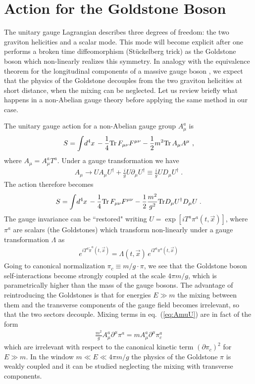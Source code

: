 \documentclass[12pt,letterpaper]{article}
\def\be{\begin{eqnarray}}
\def\ee{\end{eqnarray}}
\begin{document}
{\section{Action for the Goldstone Boson\label{sec:Goldstone}}
The unitary gauge Lagrangian describes three degrees of freedom: the
two graviton helicities and a scalar mode. This mode will become
explicit after one performs a broken time diffeomorphism
(St\"u{}ckelberg trick) as the Goldstone boson which non-linearly realizes this symmetry. In analogy with the equivalence theorem for the longitudinal components of a massive gauge boson \cite{Cornwall:1974km}, we expect that the physics of the Goldstone decouples from the two graviton helicities at short distance, when the mixing can be neglected.
Let us review briefly what happens in a non-Abelian gauge theory before applying the same method in our case.

The unitary gauge action for a non-Abelian gauge group $A_\mu^a$ is
\be
S = \int \! d^4x  \,-\frac{1}{4} {\rm Tr}\, F_{\mu\nu}F^{\mu\nu}-\frac12 m^2 {\rm Tr}\, A_\mu A^\mu \ ,
\ee
where $A_\mu = A_\mu^a T^a$.
Under a gauge transformation we have
\be
\label{eq:AmuU}
A_\mu \to U A_\mu U^\dagger + \frac{i}{g} U \partial_\mu U^\dagger \equiv \frac{i}{g} U D_\mu U^\dagger \;.
\ee
The action therefore becomes
\be
S = \int \! d^4x  \,-\frac{1}{4} {\rm Tr}\, F_{\mu\nu}F^{\mu\nu} - \frac12 \frac{m^2}{g^2} {\rm Tr} D_\mu U^\dagger D_\mu U \;.
\ee
The gauge invariance can be ``restored" writing $U=\exp{[i T^a \pi^a(t,\vec x)]}$, where $\pi^a$ are scalars (the Goldstones) which transform non-linearly under a gauge transformation $\Lambda$ as
\be
e^{i T^a \widetilde\pi^a(t, \vec x)} = \Lambda(t, \vec x) \,e^{i T^a \pi^a(t,\vec x)}
\ee
Going to canonical normalization $\pi_c \equiv m/g \cdot \pi$, we see that the Goldstone boson self-interactions become strongly coupled at the scale $4 \pi m/g$, which is parametrically higher than the mass of the gauge bosons.
The advantage of reintroducing the Goldstones is that for energies $E \gg m$ the mixing between them and the transverse components of the gauge field becomes irrelevant, so that the two sectors decouple.
Mixing terms in eq.~(\ref{eq:AmuU}) are in fact of the form
\be
\frac{m^2}{g} A_{\mu}^a \partial^\mu \pi^a = m A_{\mu}^a \partial^\mu \pi_c^a
\ee
which are irrelevant with respect to the canonical kinetic term $(\partial \pi_c)^2$ for $E \gg m$. In the window $m \ll E \ll 4 \pi m /g$ the physics of the Goldstone $\pi$ is weakly coupled and it can be studied neglecting the mixing with transverse components.

}
\end{document}

